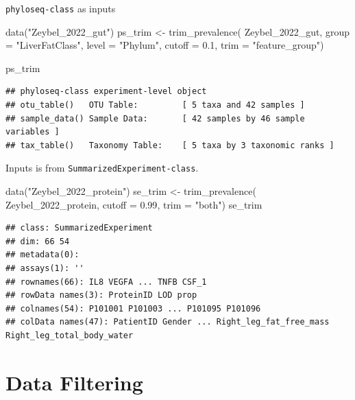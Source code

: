 \documentclass[
]{book}
\newenvironment{Shaded}{\begin{snugshade}}{\end{snugshade}}
\newcommand{\AttributeTok}[1]{\textcolor[rgb]{0.77,0.63,0.00}{#1}}
\newcommand{\FloatTok}[1]{\textcolor[rgb]{0.00,0.00,0.81}{#1}}
\newcommand{\FunctionTok}[1]{\textcolor[rgb]{0.00,0.00,0.00}{#1}}
\newcommand{\NormalTok}[1]{#1}
\newcommand{\OtherTok}[1]{\textcolor[rgb]{0.56,0.35,0.01}{#1}}
\newcommand{\StringTok}[1]{\textcolor[rgb]{0.31,0.60,0.02}{#1}}
\begin{document}
\texttt{phyloseq-class} as inputs

\begin{Shaded}
\begin{Highlighting}[]
\FunctionTok{data}\NormalTok{(}\StringTok{"Zeybel\_2022\_gut"}\NormalTok{)}
\NormalTok{ps\_trim }\OtherTok{\textless{}{-}} \FunctionTok{trim\_prevalence}\NormalTok{(}
\NormalTok{  Zeybel\_2022\_gut,}
  \AttributeTok{group =} \StringTok{"LiverFatClass"}\NormalTok{,}
  \AttributeTok{level =} \StringTok{"Phylum"}\NormalTok{,}
  \AttributeTok{cutoff =} \FloatTok{0.1}\NormalTok{,}
  \AttributeTok{trim =} \StringTok{"feature\_group"}\NormalTok{)}

\NormalTok{ps\_trim}
\end{Highlighting}
\end{Shaded}

\begin{verbatim}
## phyloseq-class experiment-level object
## otu_table()   OTU Table:         [ 5 taxa and 42 samples ]
## sample_data() Sample Data:       [ 42 samples by 46 sample variables ]
## tax_table()   Taxonomy Table:    [ 5 taxa by 3 taxonomic ranks ]
\end{verbatim}

Inputs is from \texttt{SummarizedExperiment-class}.

\begin{Shaded}
\begin{Highlighting}[]
\FunctionTok{data}\NormalTok{(}\StringTok{"Zeybel\_2022\_protein"}\NormalTok{)}
\NormalTok{se\_trim }\OtherTok{\textless{}{-}} \FunctionTok{trim\_prevalence}\NormalTok{(}
\NormalTok{  Zeybel\_2022\_protein,}
  \AttributeTok{cutoff =} \FloatTok{0.99}\NormalTok{,}
  \AttributeTok{trim =} \StringTok{"both"}\NormalTok{)}
\NormalTok{se\_trim}
\end{Highlighting}
\end{Shaded}

\begin{verbatim}
## class: SummarizedExperiment 
## dim: 66 54 
## metadata(0):
## assays(1): ''
## rownames(66): IL8 VEGFA ... TNFB CSF_1
## rowData names(3): ProteinID LOD prop
## colnames(54): P101001 P101003 ... P101095 P101096
## colData names(47): PatientID Gender ... Right_leg_fat_free_mass Right_leg_total_body_water
\end{verbatim}

\hypertarget{data-filtering}{%
\section{Data Filtering}\label{data-filtering}}
\end{document}
